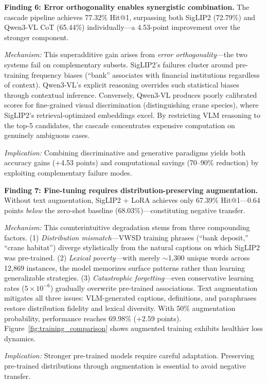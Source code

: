 \documentclass[11pt]{article}
\begin{document}
\textbf{Finding 6: Error orthogonality enables synergistic combination.}
The cascade pipeline achieves 77.32\% Hit@1, surpassing both SigLIP2 (72.79\%) and Qwen3-VL CoT (65.44\%) individually---a 4.53-point improvement over the stronger component.

\textit{Mechanism:} This superadditive gain arises from \textit{error orthogonality}---the two systems fail on complementary subsets. SigLIP2's failures cluster around pre-training frequency biases (``bank'' associates with financial institutions regardless of context). Qwen3-VL's explicit reasoning overrides such statistical biases through contextual inference. Conversely, Qwen3-VL produces poorly calibrated scores for fine-grained visual discrimination (distinguishing crane species), where SigLIP2's retrieval-optimized embeddings excel. By restricting VLM reasoning to the top-5 candidates, the cascade concentrates expensive computation on genuinely ambiguous cases.

\textit{Implication:} Combining discriminative and generative paradigms yields both accuracy gains (+4.53 points) and computational savings (70--90\% reduction) by exploiting complementary failure modes.

\textbf{Finding 7: Fine-tuning requires distribution-preserving augmentation.}
Without text augmentation, SigLIP2 + LoRA achieves only 67.39\% Hit@1---0.64 points \textit{below} the zero-shot baseline (68.03\%)---constituting negative transfer.

\textit{Mechanism:} This counterintuitive degradation stems from three compounding factors. (1) \textit{Distribution mismatch}---VWSD training phrases (``bank deposit,'' ``crane habitat'') diverge stylistically from the natural captions on which SigLIP2 was pre-trained. (2) \textit{Lexical poverty}---with merely $\sim$1,300 unique words across 12,869 instances, the model memorizes surface patterns rather than learning generalizable strategies. (3) \textit{Catastrophic forgetting}---even conservative learning rates ($5 \times 10^{-6}$) gradually overwrite pre-trained associations. Text augmentation mitigates all three issues: VLM-generated captions, definitions, and paraphrases restore distribution fidelity and lexical diversity. With 50\% augmentation probability, performance reaches 69.98\% (+2.59 points). Figure~\ref{fig:training_comparison} shows augmented training exhibits healthier loss dynamics.

\textit{Implication:} Stronger pre-trained models require careful adaptation. Preserving pre-trained distributions through augmentation is essential to avoid negative transfer.
\end{document}

